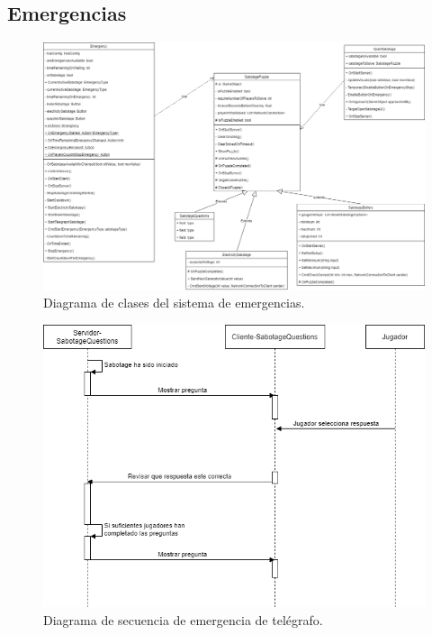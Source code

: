 \subsection{Emergencias}
\begin{figure}[h]
    \centering
    \includegraphics[width=1\linewidth]{images/DiagramaClasesEmergencias.png}
    \caption{Diagrama de clases del sistema de emergencias.}
    \label{fig:diagrama_clases_emergencias}
\end{figure}
\begin{figure}[p]
            \centering
            \includegraphics[width=1\linewidth]{images/diagrama_secuencia_sabotage_preguntas.png}
            \caption{Diagrama de secuencia de emergencia de telégrafo.}
            \label{fig:diagrama_secuencia_emergencia_pregunta}
        \end{figure}
